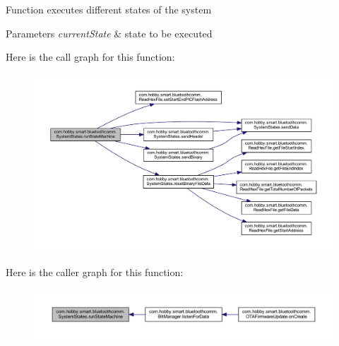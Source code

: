 Function executes different states of the system 
\begin{DoxyParams}{Parameters}
{\em current\+State} & state to be executed \\
\hline
\end{DoxyParams}
Here is the call graph for this function\+:\nopagebreak
\begin{figure}[H]
\begin{center}
\leavevmode
\includegraphics[width=350pt]{classcom_1_1hobby_1_1smart_1_1bluetoothcomm_1_1_system_states_a86f180683e8af92cb4b605cbfc5288a5_cgraph}
\end{center}
\end{figure}
Here is the caller graph for this function\+:\nopagebreak
\begin{figure}[H]
\begin{center}
\leavevmode
\includegraphics[width=350pt]{classcom_1_1hobby_1_1smart_1_1bluetoothcomm_1_1_system_states_a86f180683e8af92cb4b605cbfc5288a5_icgraph}
\end{center}
\end{figure}
\mbox{\label{classcom_1_1hobby_1_1smart_1_1bluetoothcomm_1_1_system_states_aa47a31862e84238f71df30cfe26a6d80}} 
